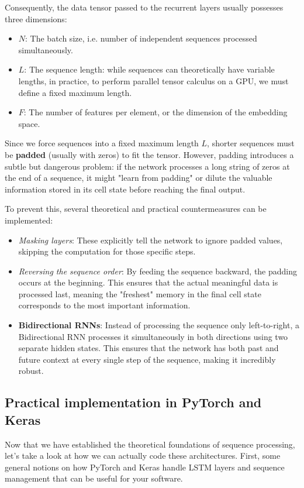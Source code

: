 Consequently, the data tensor passed to the recurrent layers usually possesses three dimensions:
\begin{itemize}
    \item[-] $N$: The batch size, i.e. number of independent sequences processed simultaneously.
    \item[-] $L$: The sequence length: while sequences can theoretically have variable lengths, in practice, to perform parallel tensor calculus on a GPU, we must define a fixed maximum length.
    \item[-] $F$: The number of features per element, or the dimension of the embedding space.
\end{itemize}

Since we force sequences into a fixed maximum length $L$, shorter sequences must be \textbf{padded} (usually with zeros) to fit the tensor. However, padding introduces a subtle but dangerous problem: if the network processes a long string of zeros at the end of a sequence, it might "learn from padding" or dilute the valuable information stored in its cell state before reaching the final output.

To prevent this, several theoretical and practical countermeasures can be implemented:
\begin{itemize}
    \item[-] \textit{Masking layers}: These explicitly tell the network to ignore padded values, skipping the computation for those specific steps.
    \item[-] \textit{Reversing the sequence order}: By feeding the sequence backward, the padding occurs at the beginning. This ensures that the actual meaningful data is processed last, meaning the "freshest" memory in the final cell state corresponds to the most important information.
    \item[-] \textbf{Bidirectional RNNs}: Instead of processing the sequence only left-to-right, a Bidirectional RNN processes it simultaneously in both directions using two separate hidden states. This ensures that the network has both past and future context at every single step of the sequence, making it incredibly robust.
\end{itemize}

\subsection{Practical implementation in PyTorch and Keras}

Now that we have established the theoretical foundations of sequence processing, let's take a look at how we can actually code these architectures. First, some general notions on how PyTorch and Keras handle LSTM layers and sequence management that can be useful for your software.

